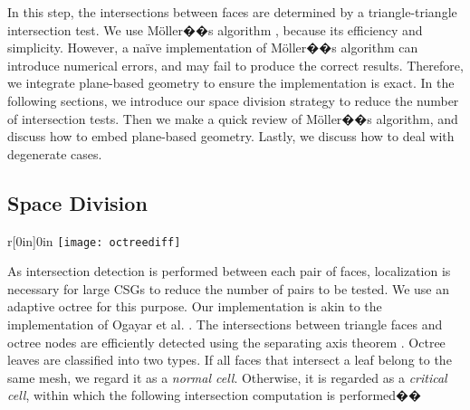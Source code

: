 In this step, the intersections between faces are determined by a triangle-triangle intersection test. We use  M\"{o}ller��s algorithm \cite{moller1997fast}, because its efficiency and simplicity. However, a na\"{i}ve implementation of  M\"{o}ller��s algorithm can introduce numerical errors, and may fail to produce the correct results. Therefore, we integrate plane-based geometry to ensure the implementation is exact. In the following sections, we introduce our space division strategy to reduce the number of intersection tests. Then we make a quick review of  M\"{o}ller��s algorithm, and discuss how to embed plane-based geometry. Lastly, we discuss how to deal with degenerate cases.



\subsection{Space Division}
\begin{wrapfigure}{r}[0in]{0in}
\texttt{[image: octreediff]}
\end{wrapfigure}



As intersection detection is performed between each pair of faces, localization is necessary for large CSGs to reduce the number of pairs to be tested. We use an adaptive octree for this purpose. Our implementation is akin to the implementation of Ogayar et al. \cite{ogayar2015deferred}. The intersections between triangle faces and octree nodes are efficiently detected using the separating axis theorem \cite{gottschalk1996obbtree}. Octree leaves are classified into two types. If all faces that intersect a leaf belong to the same mesh, we regard it as a \emph{normal cell}. Otherwise, it is regarded as a \emph{critical cell}, within which the following intersection computation is performed��

